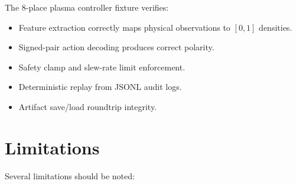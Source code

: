 \documentclass[12pt]{article}
\begin{document}
The 8-place plasma controller fixture verifies:
\begin{itemize}
  \item Feature extraction correctly maps physical observations to
    $[0,1]$ densities.
  \item Signed-pair action decoding produces correct polarity.
  \item Safety clamp and slew-rate limit enforcement.
  \item Deterministic replay from JSONL audit logs.
  \item Artifact save/load roundtrip integrity.
\end{itemize}


\section{Limitations}
\label{sec:limitations}

Several limitations should be noted:
\end{document}
